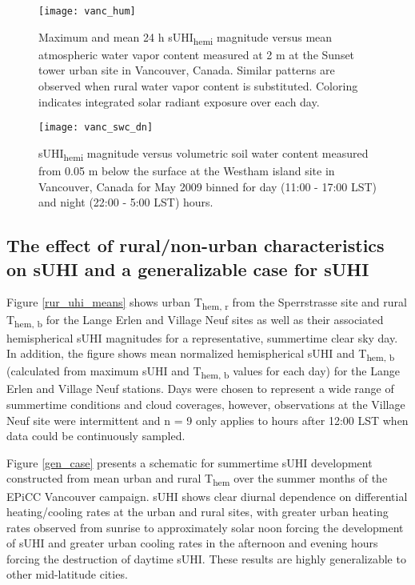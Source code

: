 \begin{bibunit}
\begin{figure}[H]
	\centering
	\texttt{[image: vanc\_hum]}
	\caption{Maximum and mean 24 \si{\hour} sUHI\textsubscript{hemi} magnitude versus mean atmospheric water vapor content measured at 2 \si{\meter} at the Sunset tower urban site in Vancouver, Canada. Similar patterns are observed when rural water vapor content is substituted. Coloring indicates integrated solar radiant exposure over each day.}
	\label{vanc_hum}
\end{figure}

\begin{figure}[H]
	\centering
	\texttt{[image: vanc\_swc\_dn]}
	\caption{sUHI\textsubscript{hemi} magnitude versus volumetric soil water content measured from 0.05 \si{\meter} below the surface at the Westham island site in Vancouver, Canada for May 2009 binned for day (11:00 - 17:00 LST) and night (22:00 - 5:00 LST) hours.}
	\label{vanc_swc}
\end{figure}

\pagebreak

\subsection{The effect of rural/non-urban characteristics on sUHI and a generalizable case for sUHI}

Figure \ref{rur_uhi_means} shows urban T\textsubscript{hem, r} from the Sperrstrasse site and rural T\textsubscript{hem, b} for the Lange Erlen and Village Neuf sites as well as their associated hemispherical sUHI magnitudes for a representative, summertime clear sky day. In addition, the figure shows mean normalized hemispherical sUHI and T\textsubscript{hem, b} (calculated from maximum sUHI and T\textsubscript{hem, b} values for each day) for the Lange Erlen and Village Neuf stations. Days were chosen to represent a wide range of summertime conditions and cloud coverages, however, observations at the Village Neuf site were intermittent and n = 9 only applies to hours after 12:00 LST when data could be continuously sampled.

Figure \ref{gen_case} presents a schematic for summertime sUHI development constructed from mean urban and rural T\textsubscript{hem} over the summer months of the EPiCC Vancouver campaign. sUHI shows clear diurnal dependence on differential heating/cooling rates at the urban and rural sites, with greater urban heating rates observed from sunrise to approximately solar noon forcing the development of sUHI and greater urban cooling rates in the afternoon and evening hours forcing the destruction of daytime sUHI. These results are highly generalizable to other mid-latitude cities. 


\end{bibunit}
